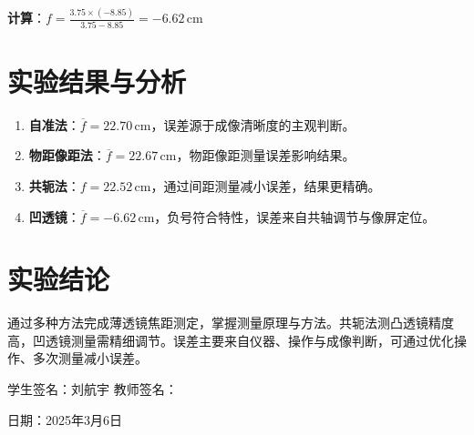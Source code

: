 \documentclass[12pt,a4paper]{article}
\begin{document}
\textbf{计算}：$f = \frac{3.75 \times (-8.85)}{3.75 - 8.85} = -6.62 \, \text{cm}$

\section{实验结果与分析}
\begin{enumerate}
\item \textbf{自准法}：$\overline{f} = 22.70 \, \text{cm}$，误差源于成像清晰度的主观判断。
\item \textbf{物距像距法}：$\overline{f} = 22.67 \, \text{cm}$，物距像距测量误差影响结果。
\item \textbf{共轭法}：$f = 22.52 \, \text{cm}$，通过间距测量减小误差，结果更精确。
\item \textbf{凹透镜}：$\overline{f} = -6.62 \, \text{cm}$，负号符合特性，误差来自共轴调节与像屏定位。
\end{enumerate}

\section{实验结论}
通过多种方法完成薄透镜焦距测定，掌握测量原理与方法。共轭法测凸透镜精度高，凹透镜测量需精细调节。误差主要来自仪器、操作与成像判断，可通过优化操作、多次测量减小误差。

\vspace{1cm}
\noindent 学生签名：刘航宇 \hfill 教师签名：

\vspace{0.5cm}
\noindent 日期：2025年3月6日
\end{document}
